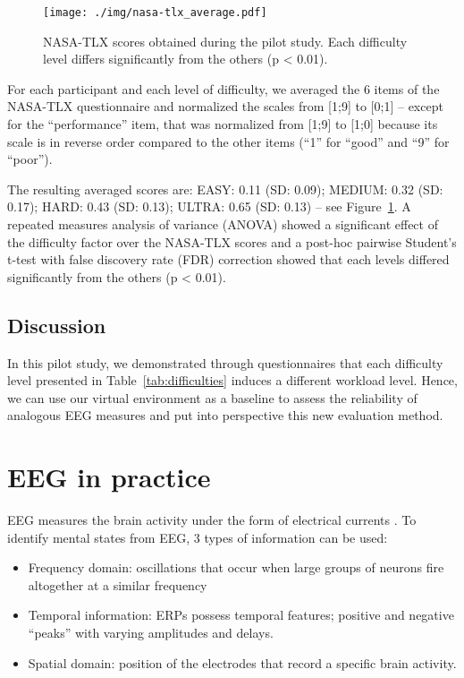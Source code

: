 \documentclass[]{sigchi}
\begin{document}
\begin{figure}
\centering
\texttt{[image: ./img/nasa-tlx\_average.pdf]}
\caption{NASA-TLX scores obtained during the pilot study. Each
difficulty level differs significantly from the others (p \textless{}
0.01).}\label{fig:nasa-tlx}
\end{figure}

For each participant and each level of difficulty, we averaged the 6
items of the NASA-TLX questionnaire and normalized the scales from
{[}1;9{]} to {[}0;1{]} -- except for the ``performance'' item, that was
normalized from {[}1;9{]} to {[}1;0{]} because its scale is in reverse
order compared to the other items (``1'' for ``good'' and ``9'' for
``poor'').

The resulting averaged scores are: EASY: 0.11 (SD: 0.09); MEDIUM: 0.32
(SD: 0.17); HARD: 0.43 (SD: 0.13); ULTRA: 0.65 (SD: 0.13) -- see
Figure~\ref{fig:nasa-tlx}. A repeated measures analysis of variance
(ANOVA) showed a significant effect of the difficulty factor over the
NASA-TLX scores and a post-hoc pairwise Student's t-test with false
discovery rate (FDR) correction showed that each levels differed
significantly from the others (p \textless{} 0.01).

\subsection{Discussion}\label{discussion}

In this pilot study, we demonstrated through questionnaires that each
difficulty level presented in Table~\ref{tab:difficulties} induces a
different workload level. Hence, we can use our virtual environment as a
baseline to assess the reliability of analogous EEG measures and put
into perspective this new evaluation method.

\section{EEG in practice}\label{eeg-in-practice}

EEG measures the brain activity under the form of electrical currents
\citep{Niedermeyer2005}. To identify mental states from EEG, 3 types of
information can be used:

\begin{itemize}
\itemsep1pt\parskip0pt
\item
  Frequency domain: oscillations that occur when large groups of neurons
  fire altogether at a similar frequency
\item
  Temporal information: ERPs possess temporal features; positive and
  negative ``peaks'' with varying amplitudes and delays.
\item
  Spatial domain: position of the electrodes that record a specific
  brain activity.
\end{itemize}
\end{document}
